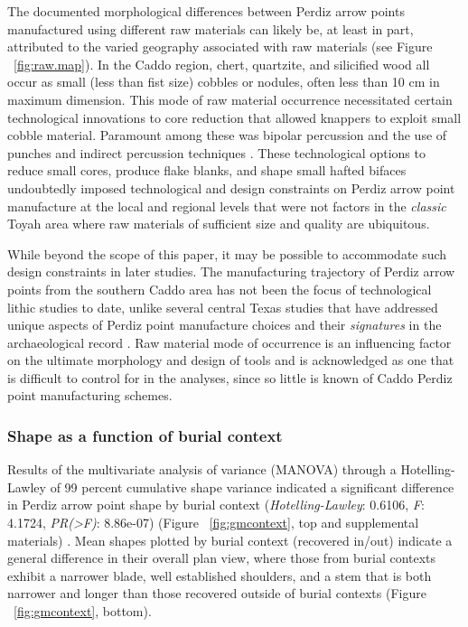 \documentclass[review]{elsarticle}
\begin{document}
The documented morphological differences between Perdiz arrow points manufactured using different raw materials can likely be, at least in part, attributed to the varied geography associated with raw materials (see Figure ~\ref{fig:raw.map}). In the Caddo region, chert, quartzite, and silicified wood all occur as small (less than fist size) cobbles or nodules, often less than 10 cm in maximum dimension. This mode of raw material occurrence necessitated certain technological innovations to core reduction that allowed knappers to exploit small cobble material. Paramount among these was bipolar percussion and the use of punches and indirect percussion techniques \citep{RN8995,RN8996,RN8997,RN8998,RN2145}. These technological options to reduce small cores, produce flake blanks, and shape small hafted bifaces undoubtedly imposed technological and design constraints on Perdiz arrow point manufacture at the local and regional levels that were not factors in the \textit{classic} Toyah area where raw materials of sufficient size and quality are ubiquitous. 

While beyond the scope of this paper, it may be possible to accommodate such design constraints in later studies. The manufacturing trajectory of Perdiz arrow points from the southern Caddo area has not been the focus of technological lithic studies to date, unlike several central Texas studies that have addressed unique aspects of Perdiz point manufacture choices and their \textit{signatures} in the archaeological record \citep{RN8999,RN9000}. Raw material mode of occurrence is an influencing factor on the ultimate morphology and design of tools and is acknowledged as one that is difficult to control for in the analyses, since so little is known of Caddo Perdiz point manufacturing schemes.

\subsubsection*{Shape as a function of burial context}

Results of the multivariate analysis of variance (MANOVA) through a Hotelling-Lawley of 99 percent cumulative shape variance indicated a significant difference in Perdiz arrow point shape by burial context (\textit{Hotelling-Lawley}: 0.6106, \textit{F}: 4.1724, \textit{PR(>F)}: 8.86e-07) (Figure ~\ref{fig:gmcontext}, top and supplemental materials) \citep[Chapter 4]{RN8980}. Mean shapes plotted by burial context (recovered in/out) indicate a general difference in their overall plan view, where those from burial contexts exhibit a narrower blade, well established shoulders, and a stem that is both narrower and longer than those recovered outside of burial contexts (Figure ~\ref{fig:gmcontext}, bottom).
\end{document}
